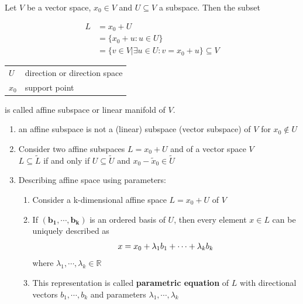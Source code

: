 Let $V$ be a vector space, $x_0 \in V$ and $U \subseteq V$ a subspace. Then the subset

\begin{table}[h]
    \begin{minipage}{0.49\linewidth}
        \begin{align*}
            L &= x_0 + U\\
             &= \{x_0 + u : u \in U\} \\
             &= \{v \in V | \exists u \in U : v = x_0 + u\} \subseteq V
        \end{align*}
    \end{minipage}
    \hfill
    \begin{minipage}{0.49\linewidth}
        \begin{table}[H]
            \begin{tabular}{l l}
                $U$ & direction or direction space \\
                $x_0$ & support point \\
            \end{tabular}
        \end{table}
    \end{minipage}
\end{table}

is called affine subspace or linear manifold of $V$. 


\begin{enumerate}
    \item an affine subspace is not a (linear) subspace (vector subspace) of $V$ for $x_0 \not\in U$

    \item Consider two affine subspaces $L = x_0 + U$ and  of a vector space $V$\\
    $L \subseteq \tilde{L}$ if and only if $U \subseteq \tilde{U}$ and $x_0 - \tilde{x}_0 \in \tilde{U}$
    
    \item Describing affine space using parameters:
    \begin{enumerate}
        \item Consider a k-dimensional affine space $L = x_0 + U$ of $V$

        \item If $\mathbf{(b_1, \cdots , b_k)}$ is an ordered basis of $U$, then every element $x \in L$ can be uniquely described as
        \[
            \hfill 
            x = x_0 + \lambda_1b_1 + \cdots + \lambda_kb_k 
            \hfill
        \]
        where $\lambda_1, \cdots , \lambda_k \in \mathbb{R}$

        \item This representation is called \textbf{parametric equation} of $L$ with directional vectors $b_1, \cdots , b_k$ and parameters $\lambda_1, \cdots , \lambda_k$
        
    \end{enumerate}
    
\end{enumerate}


